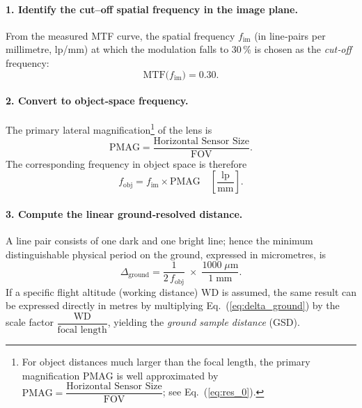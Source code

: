 \paragraph{1. Identify the cut–off spatial frequency in the image plane.}
From the measured MTF curve, the spatial frequency
$f_{\text{im}}$ (in line‑pairs per millimetre, lp/mm) at which the modulation falls to
30\,\% is chosen as the \emph{cut‑off} frequency:
%
\begin{equation}
    \text{MTF}\bigl(f_{\text{im}}\bigr)=0.30.
    \label{eq:mtf_cutoff}
\end{equation}

\paragraph{2. Convert to object‑space frequency.}
The primary lateral magnification\footnote{For object distances
much larger than the focal length, the primary magnification
$\text{PMAG}$ is well approximated by
$\text{PMAG}= \dfrac{\text{Horizontal Sensor Size}}{\text{FOV}}$;
see Eq.~(\ref{eq:res_0}).} of the lens is
%
\begin{equation}
    \label{eq:pmag}
    \text{PMAG}= \frac{\text{Horizontal Sensor Size}}{\text{FOV}}.
\end{equation}
%
The corresponding frequency in object space is therefore
%
\begin{equation}
    f_{\text{obj}} = f_{\text{im}} \times \text{PMAG}
    \quad\left[\frac{\text{lp}}{\text{mm}}\right].
    \label{eq:f_obj}
\end{equation}

\paragraph{3. Compute the linear ground‑resolved distance.}
A line pair consists of one dark and one bright line; hence the minimum
distinguishable physical period on the ground, expressed in micrometres, is
%
\begin{equation}
    \Delta_{\text{ground}} =
    \frac{1}{2\,f_{\text{obj}}}\;\times\;
    \frac{1000\;\mu\text{m}}{1\;\text{mm}}.
    \label{eq:delta_ground}
\end{equation}
%
If a specific flight altitude (working distance) $\text{WD}$ is assumed, the
same result can be expressed directly in metres by multiplying
Eq.~(\ref{eq:delta_ground}) by the scale factor
$\dfrac{\text{WD}}{\text{focal length}}$, yielding the \emph{ground sample
distance} (GSD).

